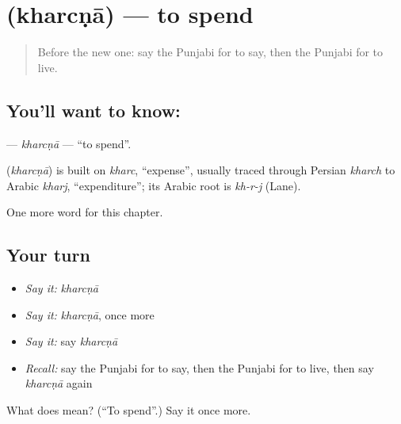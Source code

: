 \section[\texorpdfstring{\pa{ਖ਼ਰਚਣਾ} (kharcṇā)}{ਖ਼ਰਚਣਾ (kharcṇā)}]{ (kharcṇā) — to spend}

\label{lesson:PA-C151-kharcna}



\begin{quote}
Before the new one: say the Punjabi for to say, then the Punjabi for to live.
\end{quote}

\subsection*{You'll want to know: }
\textbf{} — \emph{kharcṇā} — \textquotedblleft{}to spend\textquotedblright{}.

\begin{cousinweb}
\textbf{} (\emph{kharcṇā}) is built on \emph{kharc}, \textquotedblleft{}expense\textquotedblright{}, usually traced through Persian \emph{kharch} to Arabic \emph{kharj}, \textquotedblleft{}expenditure\textquotedblright{}; its Arabic root is \emph{kh-r-j} (Lane).
\end{cousinweb}

\begin{grammarlens}[title={What you've built}]
One more word for this chapter.
\end{grammarlens}

\subsection*{Your turn}
\begin{itemize}
\raggedright
  \item \emph{Say it:} \emph{kharcṇā}
  \item \emph{Say it:} \emph{kharcṇā}, once more
  \item \emph{Say it:} say \emph{kharcṇā}
  \item \emph{Recall:} say the Punjabi for to say, then the Punjabi for to live, then say \emph{kharcṇā} again
\end{itemize}

\begin{tcolorbox}[breakable,colback=teal!4,colframe=teal!35!black,title={Before you move on}]
What does  mean? (\textquotedblleft{}To spend\textquotedblright{}.) Say it once more.
\end{tcolorbox}
